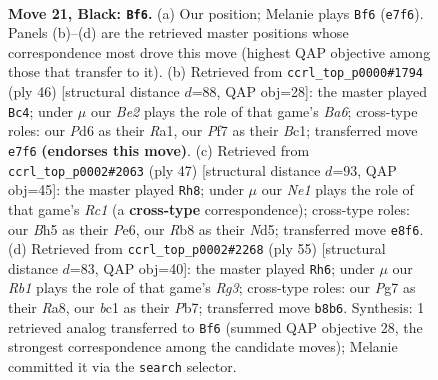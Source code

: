 \documentclass[11pt]{article}
\begin{document}
\clearpage

\begin{figure}[p]\centering
\begin{subfigure}{0.46\textwidth}\centering
\resizebox{\linewidth}{!}{%
\newchessgame
\chessboard[
  setfen={1rr1n1k1/2p1bppp/p1Np4/5P1b/2P1P2n/PB6/6P1/RNB1R1K1 b - - 2 21},
  showmover=false,
  pgfstyle=straightmove, color=movearrow, markmove={e7-f6}
]}
\caption{}
\end{subfigure}\hfill
\begin{subfigure}{0.46\textwidth}\centering
\resizebox{\linewidth}{!}{%
\newchessgame
\chessboard[
  setfen={r4r1k/6p1/Bp1n1b1p/5p2/3np3/2NP4/PPP2PPP/R1B2RK1 w - - 0 24},
  showmover=false,
  pgfstyle=straightmove, color=movearrow, markmove={a6-c4}
]}
\caption{}
\end{subfigure}
\\[4pt]
\begin{subfigure}{0.46\textwidth}\centering
\resizebox{\linewidth}{!}{%
\newchessgame
\chessboard[
  setfen={2r5/2rpkpp1/p1b1p3/N2nP2p/Pp1R1P2/1P1B4/2P3PP/1K2R3 b - - 0 24},
  showmover=false,
  pgfstyle=straightmove, color=movearrow, markmove={c8-h8}
]}
\caption{}
\end{subfigure}\hfill
\begin{subfigure}{0.46\textwidth}\centering
\resizebox{\linewidth}{!}{%
\newchessgame
\chessboard[
  setfen={r5k1/1p2b1pp/p3n1r1/4Nb2/PP1B1p2/2P3P1/3N1P1P/R2R1K2 b - - 7 28},
  showmover=false,
  pgfstyle=straightmove, color=movearrow, markmove={g6-h6}
]}
\caption{}
\end{subfigure}
\caption{\textbf{Move 21, Black: \texttt{Bf6}.} (a) Our position; Melanie plays \texttt{Bf6} (\texttt{e7f6}). Panels (b)--(d) are the retrieved master positions whose correspondence most drove this move (highest QAP objective among those that transfer to it). (b) Retrieved from \texttt{ccrl\_top\_p0000\#1794} (ply 46) [structural distance $d$=88, QAP obj=28]: the master played \texttt{Bc4}; under $\mu$ our \emph{Be2} plays the role of that game's \emph{Ba6}; cross-type roles: our \emph{P}d6 as their \emph{R}a1, our \emph{P}f7 as their \emph{B}c1; transferred move \texttt{e7f6} \textbf{(endorses this move)}. (c) Retrieved from \texttt{ccrl\_top\_p0002\#2063} (ply 47) [structural distance $d$=93, QAP obj=45]: the master played \texttt{Rh8}; under $\mu$ our \emph{Ne1} plays the role of that game's \emph{Rc1} (a \textbf{cross-type} correspondence); cross-type roles: our \emph{B}h5 as their \emph{P}e6, our \emph{R}b8 as their \emph{N}d5; transferred move \texttt{e8f6}. (d) Retrieved from \texttt{ccrl\_top\_p0002\#2268} (ply 55) [structural distance $d$=83, QAP obj=40]: the master played \texttt{Rh6}; under $\mu$ our \emph{Rb1} plays the role of that game's \emph{Rg3}; cross-type roles: our \emph{P}g7 as their \emph{R}a8, our \emph{b}c1 as their \emph{P}b7; transferred move \texttt{b8b6}. Synthesis: 1 retrieved analog transferred to \texttt{Bf6} (summed QAP objective 28, the strongest correspondence among the candidate moves); Melanie committed it via the \texttt{search} selector.}
\label{fig:thought-m41}
\end{figure}
\end{document}
